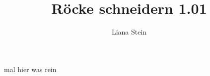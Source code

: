 \documentclass{scrartcl}
\begin{document}

  \title{R\"ocke schneidern 1.01}
  \author{Liana Stein}
\maketitle
mal hier was rein
\end{document}
